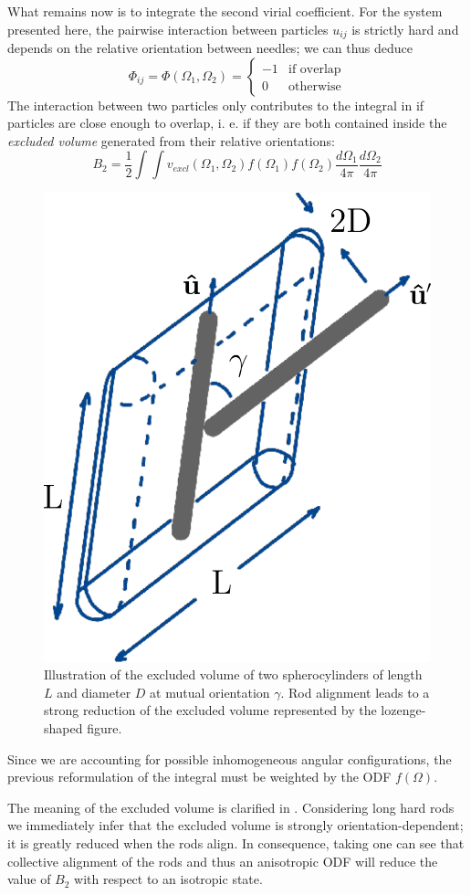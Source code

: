 What remains now is to integrate the second virial coefficient. For the system presented here, the pairwise interaction between particles $u_{ij}$ is strictly hard and depends on the relative orientation between needles; we can thus deduce
\begin{equation}
\Phi_{ij}=\Phi(\Omega_1,\Omega_2)=
\begin{cases}
-1 & \textrm{if overlap}\\
0 & \textrm{otherwise}
\end{cases}
\end{equation}
The interaction between two particles only contributes to the integral in  if particles are close enough to overlap, i. e. if they are both contained inside the {\em excluded volume} generated from their relative orientations:
\begin{equation}
B_2 = \frac{1}{2} \int \int v_{excl}(\Omega_1,\Omega_2) f(\Omega_1) f(\Omega_2)\frac{d\Omega_1}{4\pi}  \frac{d\Omega_2}{4\pi}
 \label{B2_exclv}
\end{equation}

\begin{figure}
\includegraphics[width= 0.4 \columnwidth]{figures/chapter-1/exclvol}
\caption[Illustration of the excluded volume of two spherocylinders  of length $L$ and diameter $D$ at mutual orientation $\gamma$]{ \label{introfig3} Illustration of the excluded volume of two spherocylinders  of length $L$ and diameter $D$ at mutual orientation $\gamma$. Rod alignment leads to a strong reduction of the excluded volume represented by the lozenge-shaped figure.}
\end{figure}

Since we are accounting for possible inhomogeneous angular configurations, the previous reformulation of the integral must be weighted by the ODF $f(\Omega)$.

The meaning of the excluded volume is clarified in . Considering long hard rods we immediately infer that the excluded volume is strongly orientation-dependent; it is greatly reduced when the rods align. In consequence, taking  one can see that collective alignment of the rods and thus an anisotropic ODF will reduce the value of $B_2$ with respect to an isotropic state.

